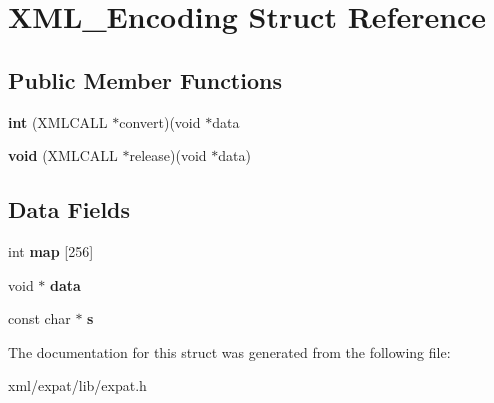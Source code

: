 \hypertarget{struct_x_m_l___encoding}{\section{X\-M\-L\-\_\-\-Encoding Struct Reference}
\label{struct_x_m_l___encoding}
}
\subsection*{Public Member Functions}
\begin{DoxyCompactItemize}
\item 
\hypertarget{struct_x_m_l___encoding_a0e78058177f2573fd3e3597cfea390ef}{{\bfseries int} (X\-M\-L\-C\-A\-L\-L $\ast$convert)(void $\ast$data}\label{struct_x_m_l___encoding_a0e78058177f2573fd3e3597cfea390ef}

\item 
\hypertarget{struct_x_m_l___encoding_a8af470efc752980eaed0893cd1a2353a}{{\bfseries void} (X\-M\-L\-C\-A\-L\-L $\ast$release)(void $\ast$data)}\label{struct_x_m_l___encoding_a8af470efc752980eaed0893cd1a2353a}

\end{DoxyCompactItemize}
\subsection*{Data Fields}
\begin{DoxyCompactItemize}
\item 
\hypertarget{struct_x_m_l___encoding_a969fc4ff9f38c5e5d9105efb1b64f8af}{int {\bfseries map} \mbox{[}256\mbox{]}}\label{struct_x_m_l___encoding_a969fc4ff9f38c5e5d9105efb1b64f8af}

\item 
\hypertarget{struct_x_m_l___encoding_a308f320aa234f14b1effd3526a7ae840}{void $\ast$ {\bfseries data}}\label{struct_x_m_l___encoding_a308f320aa234f14b1effd3526a7ae840}

\item 
\hypertarget{struct_x_m_l___encoding_a71954164de94d278141718e5e80771ae}{const char $\ast$ {\bfseries s}}\label{struct_x_m_l___encoding_a71954164de94d278141718e5e80771ae}

\end{DoxyCompactItemize}


The documentation for this struct was generated from the following file\-:\begin{DoxyCompactItemize}
\item 
xml/expat/lib/expat.\-h\end{DoxyCompactItemize}

